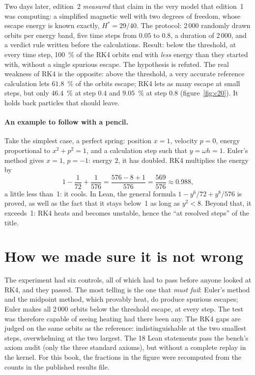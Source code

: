 Two days later, edition~2 \emph{measured} that claim in the very model that edition~1 was computing: a simplified
magnetic well with two degrees of freedom, whose escape energy is known exactly, $H^*=29/40$. The protocol:
2\,000 randomly drawn orbits per energy band, five time steps from $0.05$ to $0.8$, a duration of 2\,000, and a
verdict rule written before the calculations. Result: below the threshold, at every time step, 100~\% of the RK4
orbits end with \emph{less} energy than they started with, without a single spurious escape. The hypothesis is
refuted. The real weakness of RK4 is the opposite: above the threshold, a very accurate reference calculation lets
$61.8$~\% of the orbits escape; RK4 lets as many escape at small steps, but only $46.4$~\% at step $0.4$ and
$9.05$~\% at step $0.8$ (figure~\ref{fig:c20}). It holds back particles that should leave.

\paragraph{An example to follow with a pencil.} Take the simplest case, a perfect spring: position $x=1$,
velocity $p=0$, energy proportional to $x^2+p^2=1$, and a calculation step such that $y=\omega h=1$. Euler's method gives
$x=1$, $p=-1$: energy $2$, it has doubled. RK4 multiplies the energy by
\[
1-\frac{1}{72}+\frac{1}{576}=\frac{576-8+1}{576}=\frac{569}{576}\approx0.988,
\]
a little less than~1: it cools. In Lean, the general formula $1-y^6/72+y^8/576$ is proved, as well as the fact that
it stays below~1 as long as $y^2<8$. Beyond that, it exceeds~1: RK4 heats and becomes unstable, hence the
``at resolved steps'' of the title.

\section*{How we made sure it is not wrong}

The experiment had six controls, all of which had to pass before anyone looked at RK4, and they passed. The most
telling is the one that \emph{must fail}: Euler's method and the midpoint method, which provably heat, do produce
spurious escapes; Euler makes all 2\,000 orbits below the threshold escape, at every step. The test was therefore
capable of seeing heating had there been any. The RK4 gaps are judged on the same orbits as the reference:
indistinguishable at the two smallest steps, overwhelming at the two largest. The 18 Lean statements pass the
bench's axiom audit (only the three standard axioms), but without a complete replay in the kernel. For this book,
the fractions in the figure were recomputed from the counts in the published results file.

